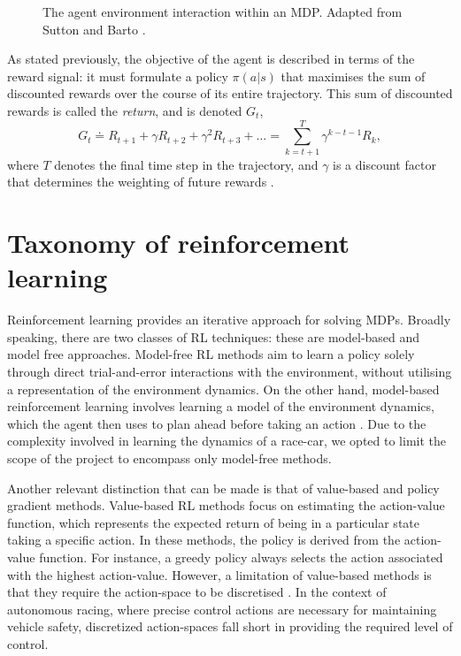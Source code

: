 \begin{figure}[!htb]
\centering

\caption[The agent environment interaction within an MDP]{The agent environment interaction within an MDP. Adapted from Sutton and Barto \cite{sutton2020}. }
\label{fig:agent_env_boundary}
\end{figure}


As stated previously, the objective of the agent is described in terms of the reward signal: it must formulate a policy $\pi(a|s)$ that maximises the sum of discounted rewards over the course of its entire trajectory.
This sum of discounted rewards is called the \emph{return}, and is denoted $G_t$,
\begin{equation}
G_t \doteq R_{t+1} + \gamma R_{t+2} + \gamma^2 R_{t+3} + ... = \sum_{k=t+1}^{T} \gamma^{k-t-1} R_{k},
\label{eq:G_t_discount}
\end{equation}
where $T$ denotes the final time step in the trajectory, and $\gamma$ is a discount factor that determines the weighting of future rewards \cite{sutton2020}.





\section{Taxonomy of reinforcement learning}

Reinforcement learning provides an iterative approach for solving MDPs.
Broadly speaking, there are two classes of RL techniques: these are model-based and model free approaches.
Model-free RL methods aim to learn a policy solely through direct trial-and-error interactions with the environment, without utilising a representation of the environment dynamics.
On the other hand, model-based reinforcement learning involves learning a model of the environment dynamics, which the agent then uses to plan ahead before taking an action \cite{wang2019benchmarking}.
Due to the complexity involved in learning the dynamics of a race-car, we opted to limit the scope of the project to encompass only model-free methods.

Another relevant distinction that can be made is that of value-based and policy gradient methods.
Value-based RL methods  focus on estimating the action-value function, which represents the expected return of being in a particular state taking a specific action.
In these methods, the policy is derived from the action-value function.
For instance, a greedy policy always selects the action associated with the highest action-value.
However, a limitation of value-based methods is that they require the action-space to be discretised \cite{sutton2020}.
In the context of autonomous racing, where precise control actions are necessary for maintaining vehicle safety, discretized action-spaces fall short in providing the required level of control.

